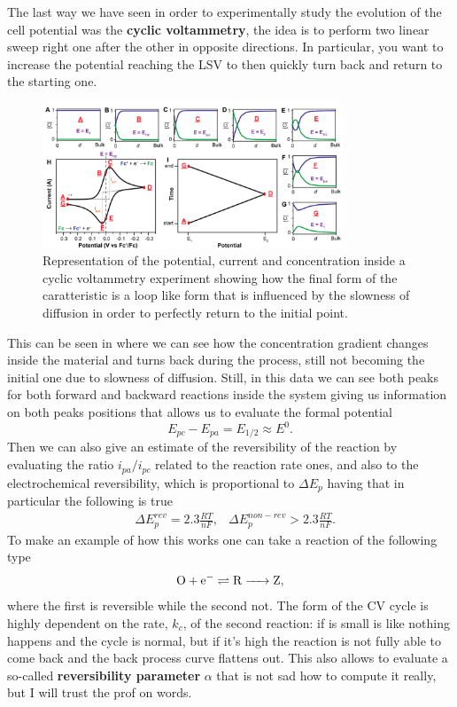 The last way we have seen in order to experimentally study the evolution of the cell potential was the \textbf{cyclic voltammetry}, the idea is to perform two linear sweep right one after the other in opposite directions. In particular, you want to increase the potential reaching the LSV to then quickly turn back and return to the starting one. 
\begin{figure}[t]
    \centering
    \includegraphics[width=0.8\textwidth]{Immagini/CyclicVoltam.png}
    \caption{
        Representation of the potential, current and concentration inside a cyclic voltammetry experiment showing how the final form of the caratteristic is a loop like form that is influenced by the slowness of diffusion in order to perfectly return to the initial point.
    }
    \label{fig:CyclicVoltam}
\end{figure}
This can be seen in  where we can see how the concentration gradient changes inside the material and turns back during the process, still not becoming the initial one due to slowness of diffusion. Still, in this data we can see both peaks for both forward and backward reactions inside the system giving us information on both peaks positions that allows us to evaluate the formal potential
\begin{equation}
    E_{pc} - E_{pa} = E_{1/2} \approx E^0.
\end{equation} 
Then we can also give an estimate of the reversibility of the reaction by evaluating the ratio $i_{pa}/i_{pc}$ related to the reaction rate ones, and also to the electrochemical reversibility, which is proportional to $\Delta E_p$ having that in particular the following is true 
\begin{align}
    &\Delta E_p^{rev} = 2.3\frac{RT}{nF}, &\Delta E_p^{non-rev} > 2.3 \frac{RT}{nF}.
\end{align}
To make an example of how this works one can take a reaction of the following type
\begin{equation}
    \ce{O + e^-}\rightleftharpoons \ce{R -> Z}, 
\end{equation}
where the first is reversible while the second not. The form of the CV cycle is highly dependent on the rate, $k_c$, of the second reaction: if is small is like nothing happens and the cycle is normal, but if it's high the reaction is not fully able to come back and the back process curve flattens out. This also allows to evaluate a so-called \textbf{reversibility parameter} $\alpha$ that is not sad how to compute it really, but I will trust the prof on words.
